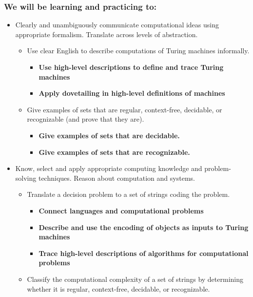 \subsubsection*{We will be learning and practicing to:}

\vspace{-20pt}

\begin{itemize}
    \item Clearly and unambiguously communicate computational ideas using appropriate formalism. Translate across levels of abstraction.
    \begin{itemize}
        \item Use clear English to describe computations of Turing machines informally.
        \begin{itemize}
                \item {\bf Use high-level descriptions to define and trace Turing machines}
                \item {\bf Apply dovetailing in high-level definitions of machines}
        \end{itemize}
        \item Give examples of sets that are regular, context-free, decidable, or recognizable (and prove that they are).
        \begin{itemize}
          \item {\bf Give examples of sets that are decidable.}
          \item {\bf Give examples of sets that are recognizable.}
       \end{itemize}
    \end{itemize}
    \item Know, select and apply appropriate computing knowledge and problem-solving techniques. Reason about computation and systems.
    \begin{itemize}
        \item Translate a decision problem to a set of strings coding the problem.
        \begin{itemize}
        \item {\bf Connect languages and computational problems}
        \item {\bf Describe and use the encoding of objects as inputs to Turing machines}
        \item {\bf Trace high-level descriptions of algorithms for computational problems}
        \end{itemize}
    \item Classify the computational complexity of a set of strings by determining whether it is regular, context-free, decidable, or recognizable.

\end{itemize}
\end{itemize}
